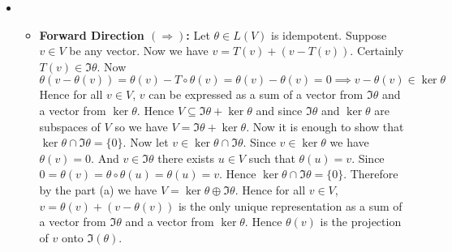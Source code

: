\documentclass[a4paper, 11pt]{article}
\begin{document}
{\begin{itemize}
	\item \begin{itemize}
		\item \textbf{Forward Direction $\boldsymbol{(\Rightarrow)}$:} Let $\theta\in L(V)$ is idempotent. Suppose $v\in V$ be any vector. Now we have $v=T(v)+(v-T(v))$. Certainly $T(v)\in \Im \theta$. Now $$\theta(v-\theta(v))=\theta(v)-T\circ \theta(v)=\theta(v)-\theta(v)=0\implies v-\theta(v)\in \ker\theta$$ Hence for all $v\in V$, $v$ can be expressed as a sum of a vector from $\Im\theta$ and a vector from $\ker \theta$. Hence $V\subseteq \Im\theta +\ker\theta$ and since $\Im\theta $ and $\ker\theta$ are subspaces of $V$ so we have $V=\Im\theta+\ker\theta$. Now it is enough to show that $\ker\theta\cap \Im\theta=\{0\}$. Now let $v\in\ker\theta\cap \Im\theta$. Since $v\in \ker\theta$ we have $\theta(v)=0$. And $v\in\Im\theta$ there exists $u\in V$ such that $\theta(u)=v$. Since $0=\theta(v)=\theta\circ \theta(u)=\theta(u)=v$. Hence $\ker\theta\cap \Im\theta=\{0\}$. Therefore by the part (a) we have $V=\ker\theta\oplus \Im\theta$. Hence for all $v\in V$, $v=\theta(v)+(v-\theta(v))$ is the only unique representation as a sum of a vector from $\Im\theta $ and a vector from $\ker\theta$. Hence $\theta(v)$ is the projection of $v$ onto $\Im(\theta)$. 
		

\end{itemize}
\end{itemize}}
\end{document}
